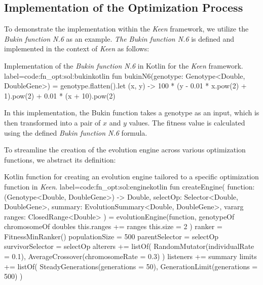     \subsection{Implementation of the Optimization Process}
        To demonstrate the implementation within the \textit{Keen} framework, we utilize the \textit{Bukin function N.6} 
        as an example. \textit{The Bukin function N.6} is defined and implemented in the context of \textit{Keen} as 
        follows:

        \begin{code}{
        Implementation of the \textit{Bukin function N.6} in Kotlin for the 
        \textit{Keen} framework.
        }{label=code:fn_opt:sol:bukin}{kotlin}
        fun bukinN6(genotype: Genotype<Double, DoubleGene>) = genotype.flatten().let { (x, y) ->
            100 * (y - 0.01 * x.pow(2) + 1).pow(2) + 0.01 * (x + 10).pow(2)
        }
        \end{code}

        In this implementation, the Bukin function takes a genotype as an input, which is then transformed into a pair 
        of \(x\) and \(y\) values. The fitness value is calculated using the defined \textit{Bukin function N.6} 
        formula.

        To streamline the creation of the evolution engine across various optimization functions, we abstract its 
        definition:

        \begin{code}{
            Kotlin function for creating an evolution engine tailored to a specific optimization function in
            \textit{Keen}.
        }{label=code:fn_opt:sol:engine}{kotlin}
            fun createEngine(
                function: (Genotype<Double, DoubleGene>) -> Double,
                selectOp: Selector<Double, DoubleGene>,
                summary: EvolutionSummary<Double, DoubleGene>,
                vararg ranges: ClosedRange<Double>
            ) = evolutionEngine(function, genotypeOf {
                chromosomeOf {
                    doubles {
                        this.ranges += ranges
                        this.size = 2
                    }
                }
            }) {
                ranker = FitnessMinRanker()
                populationSize = 500
                parentSelector = selectOp
                survivorSelector = selectOp
                alterers += listOf(
                    RandomMutator(individualRate = 0.1), 
                    AverageCrossover(chromosomeRate = 0.3)
                )
                listeners += summary
                limits += listOf(
                    SteadyGenerations(generations = 50), 
                    GenerationLimit(generations = 500)
                )
            }
        \end{code}

